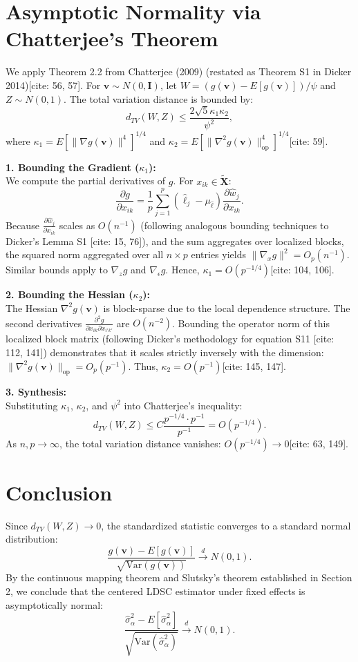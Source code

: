\documentclass{article}
\newcommand{\X}{\mathbf{X}}
\newcommand{\I}{\mathbf{I}}
\newcommand{\1}{\mathbf{1}}
\newcommand{\Var}{\mathrm{Var}}
\begin{document}
\section{Asymptotic Normality via Chatterjee's Theorem}

We apply Theorem 2.2 from Chatterjee (2009) (restated as Theorem S1 in Dicker 2014)[cite: 56, 57]. For $\mathbf{v} \sim N(0, \I)$, let $W = (g(\mathbf{v}) - E[g(\mathbf{v})]) / \psi$ and $Z \sim N(0, 1)$. The total variation distance is bounded by:
\[
d_{TV}(W, Z) \le \frac{2\sqrt{5} \kappa_1 \kappa_2}{\psi^2},
\]
where $\kappa_1 = E[\|\nabla g(\mathbf{v})\|^4]^{1/4}$ and $\kappa_2 = E[\|\nabla^2 g(\mathbf{v})\|_{\mathrm{op}}^4]^{1/4}$[cite: 59].

\textbf{1. Bounding the Gradient ($\kappa_1$):} \\
We compute the partial derivatives of $g$. For $x_{ik} \in \tilde{\X}$:
\[
\frac{\partial g}{\partial x_{ik}} = \frac{1}{p} \sum_{j=1}^p (\hat\ell_j - \mu_{\hat\ell}) \frac{\partial \hat{w}_j}{\partial x_{ik}}.
\]
Because $\frac{\partial \hat{w}_j}{\partial x_{ik}}$ scales as $O(n^{-1})$ (following analogous bounding techniques to Dicker's Lemma S1 [cite: 15, 76]), and the sum aggregates over localized blocks, the squared norm aggregated over all $n \times p$ entries yields $\|\nabla_x g\|^2 = O_p(n^{-1})$. Similar bounds apply to $\nabla_z g$ and $\nabla_\epsilon g$. Hence, $\kappa_1 = O(p^{-1/4})$[cite: 104, 106].

\textbf{2. Bounding the Hessian ($\kappa_2$):} \\
The Hessian $\nabla^2 g(\mathbf{v})$ is block-sparse due to the local dependence structure. The second derivatives $\frac{\partial^2 g}{\partial x_{ik} \partial x_{i'k'}}$ are $O(n^{-2})$. Bounding the operator norm of this localized block matrix (following Dicker's methodology for equation S11 [cite: 112, 141]) demonstrates that it scales strictly inversely with the dimension: $\|\nabla^2 g(\mathbf{v})\|_{\mathrm{op}} = O_p(p^{-1})$. Thus, $\kappa_2 = O(p^{-1})$[cite: 145, 147].

\textbf{3. Synthesis:} \\
Substituting $\kappa_1$, $\kappa_2$, and $\psi^2$ into Chatterjee's inequality:
\[
d_{TV}(W, Z) \le C \frac{p^{-1/4} \cdot p^{-1}}{p^{-1}} = O(p^{-1/4}).
\]
As $n, p \to \infty$, the total variation distance vanishes: $O(p^{-1/4}) \to 0$[cite: 63, 149].

\section{Conclusion}

Since $d_{TV}(W, Z) \to 0$, the standardized statistic converges to a standard normal distribution:
\[
\frac{g(\mathbf{v}) - E[g(\mathbf{v})]}{\sqrt{\Var(g(\mathbf{v}))}} \xrightarrow{d} N(0, 1).
\]
By the continuous mapping theorem and Slutsky's theorem established in Section 2, we conclude that the centered LDSC estimator under fixed effects is asymptotically normal:
\[
\frac{\hat\sigma_\alpha^2 - E[\hat\sigma_\alpha^2]}{\sqrt{\Var(\hat\sigma_\alpha^2)}} \xrightarrow{d} N(0, 1).
\]
\end{document}
